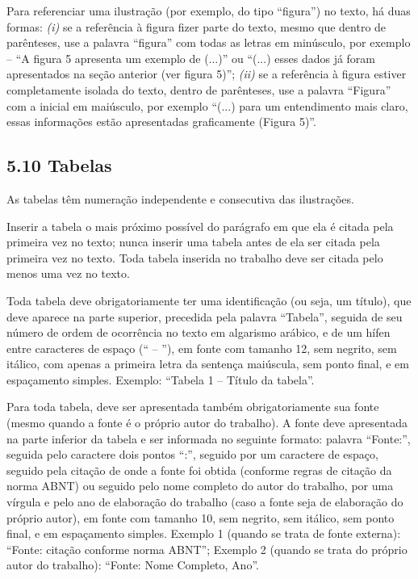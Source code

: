 \documentclass[
	12pt,				%
	oneside,			%
	a4paper,			%
	english,			%
	brazil				%
	]{abntex2ppgsi}
\begin{document}
\begin{anexosenv}
Para referenciar uma ilustração (por exemplo, do tipo ``figura'') no texto, há duas formas: \textit{(i)} se a referência à figura fizer parte do texto, mesmo que dentro de parênteses, use a palavra ``figura'' com todas as letras em minúsculo, por exemplo – ``A figura 5 apresenta um exemplo de (...)'' ou ``(...) esses dados já foram apresentados na seção anterior (ver figura 5)''; \textit{(ii)} se a referência à figura estiver completamente isolada do texto, dentro de parênteses, use a palavra ``Figura'' com a inicial em maiúsculo, por exemplo ``(...) para um entendimento mais claro, essas informações estão apresentadas graficamente (Figura 5)''.

\subsection*{5.10 Tabelas}

As tabelas têm numeração independente e consecutiva das ilustrações.

Inserir a tabela o mais próximo possível do parágrafo em que ela é citada pela primeira vez no texto; nunca inserir uma tabela antes de ela ser citada pela primeira vez no texto. Toda tabela inserida no trabalho deve ser citada pelo menos uma vez no texto.

Toda tabela deve obrigatoriamente ter uma identificação (ou seja, um título), que deve aparece na parte superior, precedida pela palavra ``Tabela'', seguida de seu número de ordem de ocorrência no texto em algarismo arábico, e de um hífen entre caracteres de espaço (`` – ''), em fonte com tamanho 12, sem negrito, sem itálico, com apenas a primeira letra da sentença maiúscula, sem ponto final, e em espaçamento simples. Exemplo: ``Tabela 1 – Título da tabela''.

Para toda tabela, deve ser apresentada também obrigatoriamente sua fonte (mesmo quando a fonte é o próprio autor do trabalho). A fonte deve apresentada na parte inferior da tabela e ser informada no seguinte formato: palavra ``Fonte:'', seguida pelo caractere dois pontos ``:'', seguido por um caractere de espaço, seguido pela citação de onde a fonte foi obtida (conforme regras de citação da norma ABNT) ou seguido pelo nome completo do autor do trabalho, por uma vírgula e pelo ano de elaboração do trabalho (caso a fonte seja de elaboração do próprio autor), em fonte com tamanho 10, sem negrito, sem itálico, sem ponto final, e em espaçamento simples. Exemplo 1 (quando se trata de fonte externa): ``Fonte: citação conforme norma ABNT''; Exemplo 2 (quando se trata do próprio autor do trabalho): ``Fonte: Nome Completo, Ano''.


\end{anexosenv}
\end{document}
